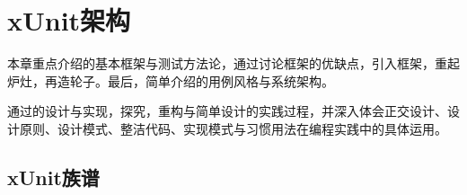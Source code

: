 \begin{savequote}[45mm]
\end{savequote}

\chapter{xUnit架构} 
\label{ch:xunit-architecture}

\begin{content}

本章重点介绍的基本框架与测试方法论，通过讨论框架的优缺点，引入框架，重起炉灶，再造轮子。最后，简单介绍的用例风格与系统架构。

通过的设计与实现，探究，重构与简单设计的实践过程，并深入体会正交设计、设计原则、设计模式、整洁代码、实现模式与习惯用法在编程实践中的具体运用。



\end{content}

\section{xUnit族谱}

